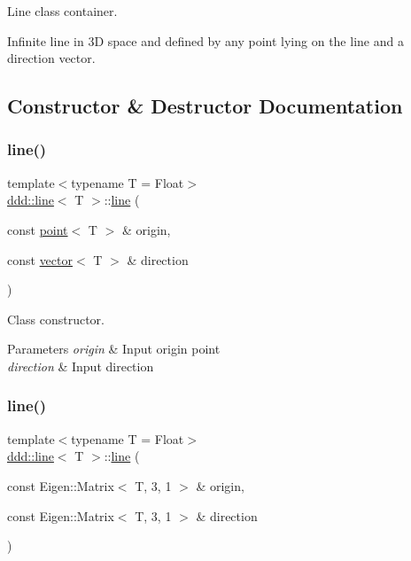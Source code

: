 Line class container. 

Infinite line in 3D space and defined by any point lying on the line and a direction vector. 

\subsection{Constructor \& Destructor Documentation}
\mbox{\label{classddd_1_1line_a8499fa13ffea06de1705c05f742e0f5c}} 
\subsubsection{\texorpdfstring{line()}{line()}\hspace{0.1cm}{\footnotesize\ttfamily [1/2]}}
{\footnotesize\ttfamily template$<$typename T = Float$>$ \\
\hyperlink{classddd_1_1line}{ddd\+::line}$<$ T $>$\+::\hyperlink{classddd_1_1line}{line} (\begin{DoxyParamCaption}\item[{const \hyperlink{classddd_1_1point}{point}$<$ T $>$ \&}]{origin,  }\item[{const \hyperlink{classddd_1_1vector}{vector}$<$ T $>$ \&}]{direction }\end{DoxyParamCaption})\hspace{0.3cm}{\ttfamily [inline]}}



Class constructor. 


\begin{DoxyParams}{Parameters}
{\em origin} & Input origin point \\
\hline
{\em direction} & Input direction \\
\hline
\end{DoxyParams}
\mbox{\label{classddd_1_1line_aef2bb8b4dcdf78f86c8e178ddd483eab}} 
\subsubsection{\texorpdfstring{line()}{line()}\hspace{0.1cm}{\footnotesize\ttfamily [2/2]}}
{\footnotesize\ttfamily template$<$typename T = Float$>$ \\
\hyperlink{classddd_1_1line}{ddd\+::line}$<$ T $>$\+::\hyperlink{classddd_1_1line}{line} (\begin{DoxyParamCaption}\item[{const Eigen\+::\+Matrix$<$ T, 3, 1 $>$ \&}]{origin,  }\item[{const Eigen\+::\+Matrix$<$ T, 3, 1 $>$ \&}]{direction }\end{DoxyParamCaption})\hspace{0.3cm}{\ttfamily [inline]}}



